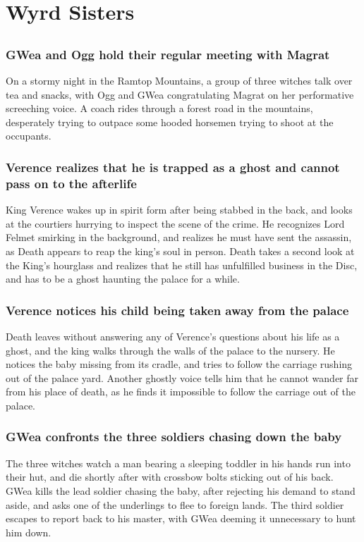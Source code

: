 \section{Wyrd Sisters}


\subsection{}
\subsubsection{\Gls{GWea} and \Gls{Ogg} hold their regular meeting with \Gls{Magrat}}
On a stormy night in the Ramtop Mountains, a group of three witches talk over tea and snacks, with
\Gls{Ogg} and \Gls{GWea} congratulating \Gls{Magrat} on her performative screeching voice. A coach
rides through a forest road in the mountains, desperately trying to outpace some hooded horsemen
trying to shoot at the occupants.

\subsubsection{\Gls{Verence} realizes that he is trapped as a ghost and cannot pass on to the
    afterlife}
King \Gls{Verence} wakes up in spirit form after being stabbed in the back, and looks at the
courtiers hurrying to inspect the scene of the crime. He recognizes Lord \Gls{Felmet} smirking in
the background, and realizes he must have sent the assassin, as \Gls{Death} appears to reap the
king's soul in person. \Gls{Death} takes a second look at the King's hourglass and realizes that he
still has unfulfilled business in the Disc, and has to be a ghost haunting the palace for a while.

\subsubsection{\Gls{Verence} notices his child being taken away from the palace}
\Gls{Death} leaves without answering any of \Gls{Verence}'s questions about his life as a ghost,
and the king walks through the walls of the palace to the nursery. He notices the baby missing from
its cradle, and tries to follow the carriage rushing out of the palace yard. Another ghostly voice
tells him that he cannot wander far from his place of death, as he finds it impossible to follow the
carriage out of the palace.

\subsubsection{\Gls{GWea} confronts the three soldiers chasing down the baby}
The three witches watch a man bearing a sleeping toddler in his hands run into their hut, and die
shortly after with crossbow bolts sticking out of his back. \Gls{GWea} kills the lead soldier
chasing the baby, after rejecting his demand to stand aside, and asks one of the underlings to flee
to foreign lands. The third soldier escapes to report back to his master, with \Gls{GWea} deeming
it unnecessary to hunt him down.


